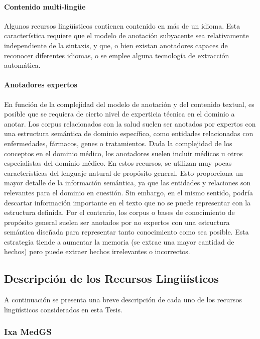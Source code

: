 \paragraph{Contenido multi-lingüe}

Algunos recursos lingüísticos contienen contenido en más de un idioma.
Esta característica requiere que el modelo de anotación subyacente sea relativamente independiente de la sintaxis, y que, o bien existan anotadores capaces de reconocer diferentes idiomas, o se emplee alguna tecnología de extracción automática.

\paragraph{Anotadores expertos}

En función de la complejidad del modelo de anotación y del contenido textual, es posible que se requiera de cierto nivel de experticia técnica en el dominio a anotar.
Los corpus relacionados con la salud suelen ser anotados por expertos con una estructura semántica de dominio específico, como entidades relacionadas con enfermedades, fármacos, genes o tratamientos. Dada la complejidad de los conceptos en el dominio médico, los anotadores suelen incluir médicos u otros especialistas del dominio médico. En estos recursos, se utilizan muy pocas características del lenguaje natural de propósito general. Esto proporciona un mayor detalle de la información semántica, ya que las entidades y relaciones son relevantes para el dominio en cuestión. Sin embargo, en el mismo sentido, podría descartar información importante en el texto que no se puede representar con la estructura definida.
Por el contrario, los corpus o bases de conocimiento de propósito general suelen ser anotados por no expertos con una estructura semántica diseñada para representar tanto conocimiento como sea posible. Esta estrategia tiende a aumentar la memoria (se extrae una mayor cantidad de hechos) pero puede extraer hechos irrelevantes o incorrectos.

\subsection{Descripción de los Recursos Lingüísticos}\label{sec:sota-corpora-list}

A continuación se presenta una breve descripción de cada uno de los recursos lingüísticos considerados en esta Tesis.

\subsubsection*{Ixa MedGS}

